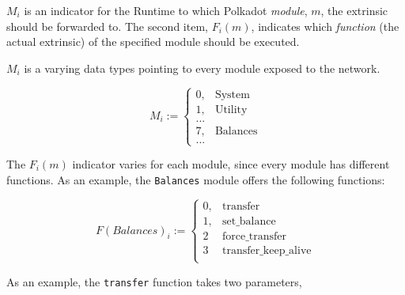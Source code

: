 $M_i$ is an indicator for the Runtime to which Polkadot \textit{module}, $m$,
the extrinsic should be forwarded to. The second item, $F_i(m)$, indicates
which \textit{function} (the actual extrinsic) of the specified module should
be executed.
\newline

$M_i$ is a varying data types pointing to every module exposed to the network.

\[
M_i :=
\begin{cases}
0, & \text{System} \\
1, & \text{Utility} \\
... & \\
7, & \text{Balances} \\
... &
\end{cases}
\]

The $F_i(m)$ indicator varies for each module, since every module has different
functions. As an example, the \verb|Balances| module offers the following
functions:

\[
F(Balances)_i :=
\begin{cases}
0, & \text{transfer} \\
1, & \text{set\_balance} \\
2 & \text{force\_transfer} \\
3 & \text{transfer\_keep\_alive} \\
\end{cases}
\]

As an example, the \verb|transfer| function takes two parameters, 
